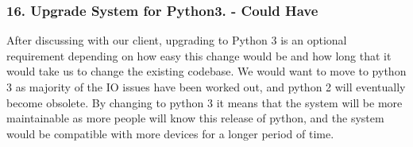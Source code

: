	\subsubsection*{16. Upgrade System for Python3. - Could Have}
	After discussing with our client, upgrading to Python 3 is an optional requirement depending on how easy this change would be and how long that it would take us to change the existing codebase. 
We would want to move to python 3 as majority of the IO issues have been worked out, and python 2 will eventually become obsolete. By changing to python 3 it means that the system will be more maintainable as more people will know this release of python, and the system would be compatible with more devices for a longer period of time.
